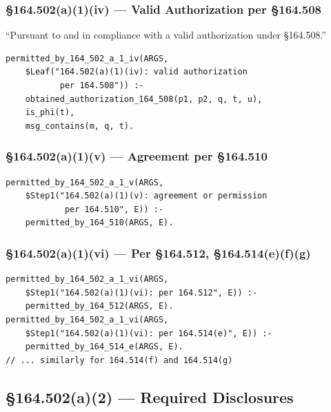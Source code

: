 \documentclass[11pt,letterpaper]{article}
\begin{document}
\subsubsection{\S 164.502(a)(1)(iv) --- Valid Authorization per \S 164.508}

\begin{hipaabox}
``Pursuant to and in compliance with a valid authorization under \S 164.508.''
\end{hipaabox}

\begin{lstlisting}[style=soufflestyle,caption={\S 164.502(a)(1)(iv) --- authorization}]
permitted_by_164_502_a_1_iv(ARGS,
    $Leaf("164.502(a)(1)(iv): valid authorization
           per 164.508")) :-
    obtained_authorization_164_508(p1, p2, q, t, u),
    is_phi(t),
    msg_contains(m, q, t).
\end{lstlisting}

\subsubsection{\S 164.502(a)(1)(v) --- Agreement per \S 164.510}

\begin{lstlisting}[style=soufflestyle,caption={\S 164.502(a)(1)(v) --- agreement}]
permitted_by_164_502_a_1_v(ARGS,
    $Step1("164.502(a)(1)(v): agreement or permission
            per 164.510", E)) :-
    permitted_by_164_510(ARGS, E).
\end{lstlisting}

\subsubsection{\S 164.502(a)(1)(vi) --- Per \S 164.512, \S 164.514(e)(f)(g)}

\begin{lstlisting}[style=soufflestyle,caption={\S 164.502(a)(1)(vi) --- other sections}]
permitted_by_164_502_a_1_vi(ARGS,
    $Step1("164.502(a)(1)(vi): per 164.512", E)) :-
    permitted_by_164_512(ARGS, E).
permitted_by_164_502_a_1_vi(ARGS,
    $Step1("164.502(a)(1)(vi): per 164.514(e)", E)) :-
    permitted_by_164_514_e(ARGS, E).
// ... similarly for 164.514(f) and 164.514(g)
\end{lstlisting}

\subsection{\S 164.502(a)(2) --- Required Disclosures}
\end{document}
